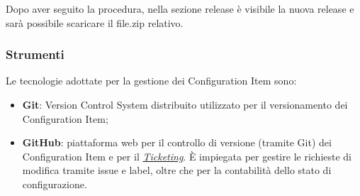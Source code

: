 Dopo aver seguito la procedura, nella sezione release è visibile la nuova release e sarà possibile scaricare il file.zip relativo.

\subsubsection{Strumenti}
Le tecnologie adottate per la gestione dei Configuration Item sono:
\begin{itemize}
    \item \textbf{Git}: Version Control System distribuito utilizzato per il versionamento dei Configuration Item;
    \item \textbf{GitHub}: piattaforma web per il controllo di versione (tramite Git) dei Configuration Item e per il \hyperlink{par:ticketing}{\textit{Ticketing}}. È impiegata per gestire le richieste di modifica tramite issue e label, oltre che per la contabilità dello stato di configurazione.
\end{itemize}
